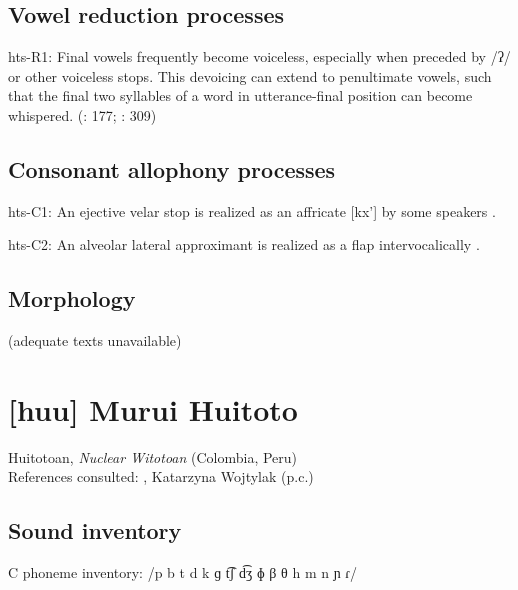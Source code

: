 {\subsection*{Vowel reduction processes}
\begin{appendixdesc}

\item[hts-R1:] Final vowels frequently become voiceless, especially when preceded by /ʔ/ or other voiceless stops. This devoicing can extend to penultimate vowels, such that the final two syllables of a word in utterance-final position can become whispered. (\citealt{SandsEtAl1996}: 177; \citealt{TuckerEtAl1977}: 309)
\end{appendixdesc}
\subsection*{Consonant allophony processes}
\begin{appendixdesc}

\item[hts-C1:] An ejective velar stop is realized as an affricate [kx’] by some speakers \citep[41]{Sands2013}.

\item[hts-C2:] An alveolar lateral approximant is realized as a flap intervocalically \citep[41]{Sands2013}.
\end{appendixdesc}
\subsection*{Morphology}

(adequate texts unavailable)

\section*{[huu] Murui Huitoto}   %
Huitotoan, \textit{Nuclear Witotoan} (Colombia, Peru)\medskip\\
References consulted: \citet{Wojtylak2017}, Katarzyna Wojtylak (p.c.)

\subsection*{Sound inventory}
\begin{appendixdesc}

\item[C phoneme inventory:] /p b t d k ɡ t͡ʃ d͡ʒ ɸ β θ h m n ɲ ɾ/


\end{appendixdesc}}

